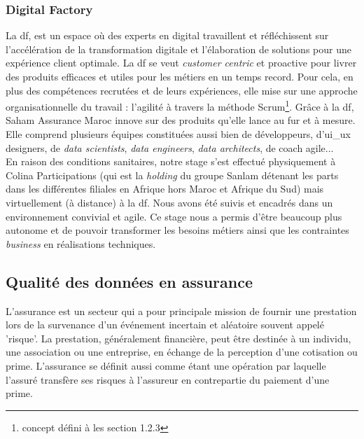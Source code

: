 \subsubsection{\textbf{Digital Factory }} 
La \acrlong{df}, est un espace où des experts en digital travaillent et r\'efl\'echissent sur l’accélération de la transformation digitale et l’élaboration de solutions pour une expérience client optimale. La \acrshort{df} se veut \textit{customer centric} et proactive pour livrer des produits efficaces et utiles
pour les métiers en un temps record. Pour cela, en plus des compétences recrutées et de leurs expériences, elle mise sur une approche organisationnelle du travail : l’agilité à travers la méthode Scrum\footnote{concept d\'efini \`a les section 1.2.3}. Grâce à la \acrlong{df}, Saham Assurance Maroc innove sur des produits qu’elle lance au fur et à mesure. Elle comprend plusieurs \'equipes constituées aussi bien de d\'eveloppeurs, d'\acrfull{ui_ux} designers, de \textit{data scientists}, \textit{data engineers}, \textit{data architects}, de coach agile...
\\

En raison des conditions sanitaires, notre stage s'est effectu\'e physiquement \`a Colina Participations (qui est la \textit{holding} du groupe Sanlam d\'etenant les parts dans les diff\'erentes filiales en Afrique hors Maroc et Afrique du Sud) mais virtuellement (\`a distance) \`a la \acrlong{df}. Nous avons \'et\'e suivis et encadr\'es dans un environnement convivial et agile. Ce stage nous a permis d'\^etre beaucoup plus autonome et de pouvoir transformer les besoins m\'etiers ainsi que les contraintes \textit{business} en r\'ealisations techniques.  


\subsection{Qualit\'e des donn\'ees en assurance}
L'assurance est un secteur qui a pour principale mission de fournir une prestation lors de la survenance d'un événement incertain et aléatoire souvent appelé 'risque'. La prestation, généralement financière, peut être destinée à un individu, une association ou une entreprise, en échange de la perception d'une cotisation ou prime. L'assurance se d\'efinit aussi comme \'etant une op\'eration par laquelle l'assur\'e transf\`ere ses risques \`a l'assureur en contrepartie du paiement d'une prime. 
\\

